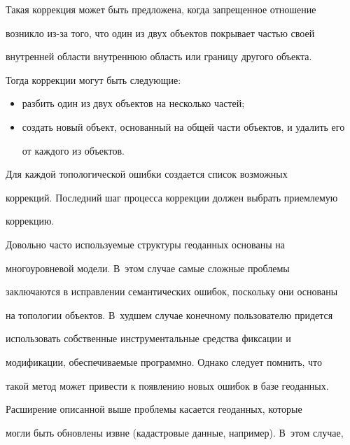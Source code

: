 Такая коррекция может быть предложена, когда запрещенное отношение 


возникло из-за того, что один из двух объектов покрывает частью своей 


внутренней области внутреннюю область или границу другого объекта. 


\pagebreak


    


    Тогда коррекции могут быть следующие: 


    \begin{itemize}


\item разбить один из двух объектов на несколько частей;


\item создать новый объект, основанный на общей части объектов, и удалить его 


от каждого из объектов. 


\end{itemize}





    Для каждой топологической ошибки создается список возможных 


коррекций. Последний шаг процесса коррекции должен выбрать приемлемую 


коррекцию. 


    


    Довольно часто используемые структуры геоданных основаны на 


многоуровневой модели. В~этом случае самые сложные проблемы 


заключаются в ис\-прав\-ле\-нии семантических ошибок, поскольку они основаны 


на топологии объектов. В~худшем случае конечному пользователю придется 


использовать собственные инструментальные средства фиксации и 


модификации, обеспечиваемые программно. Однако следует помнить, что 


такой метод может привести к появлению новых ошибок в базе геоданных. 


    


    Расширение описанной выше проблемы касается геоданных, которые 


могли быть обновлены извне (кадастровые данные, например). В~этом случае, 


